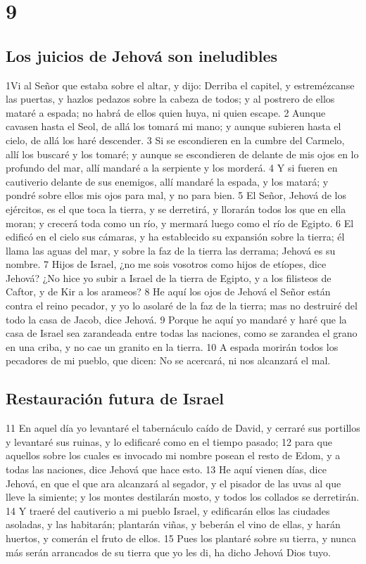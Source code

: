 \chapter{9}

\section*{Los juicios de Jehová son ineludibles}

1Vi al Señor que estaba sobre el altar, y dijo: Derriba el capitel, y estremézcanse las puertas, y hazlos pedazos sobre la cabeza de todos; y al postrero de ellos mataré a espada; no habrá de ellos quien huya, ni quien escape.
2 Aunque cavasen hasta el Seol, de allá los tomará mi mano; y aunque subieren hasta el cielo, de allá los haré descender.
3 Si se escondieren en la cumbre del Carmelo, allí los buscaré y los tomaré; y aunque se escondieren de delante de mis ojos en lo profundo del mar, allí mandaré a la serpiente y los morderá.
4 Y si fueren en cautiverio delante de sus enemigos, allí mandaré la espada, y los matará; y pondré sobre ellos mis ojos para mal, y no para bien.
5 El Señor, Jehová de los ejércitos, es el que toca la tierra, y se derretirá, y llorarán todos los que en ella moran; y crecerá toda como un río, y mermará luego como el río de Egipto.
6 El edificó en el cielo sus cámaras, y ha establecido su expansión sobre la tierra; él llama las aguas del mar, y sobre la faz de la tierra las derrama; Jehová es su nombre.
7 Hijos de Israel, ¿no me sois vosotros como hijos de etíopes, dice Jehová? ¿No hice yo subir a Israel de la tierra de Egipto, y a los filisteos de Caftor, y de Kir a los arameos?
8 He aquí los ojos de Jehová el Señor están contra el reino pecador, y yo lo asolaré de la faz de la tierra; mas no destruiré del todo la casa de Jacob, dice Jehová. 
9 Porque he aquí yo mandaré y haré que la casa de Israel sea zarandeada entre todas las naciones, como se zarandea el grano en una criba, y no cae un granito en la tierra.
10 A espada morirán todos los pecadores de mi pueblo, que dicen: No se acercará, ni nos alcanzará el mal.

\section*{Restauración futura de Israel}

11 En aquel día yo levantaré el tabernáculo caído de David, y cerraré sus portillos y levantaré sus ruinas, y lo edificaré como en el tiempo pasado;
12 para que aquellos sobre los cuales es invocado mi nombre posean el resto de Edom, y a todas las naciones, dice Jehová que hace esto. 
13 He aquí vienen días, dice Jehová, en que el que ara alcanzará al segador, y el pisador de las uvas al que lleve la simiente; y los montes destilarán mosto, y todos los collados se derretirán.
14 Y traeré del cautiverio a mi pueblo Israel, y edificarán ellos las ciudades asoladas, y las habitarán; plantarán viñas, y beberán el vino de ellas, y harán huertos, y comerán el fruto de ellos.
15 Pues los plantaré sobre su tierra, y nunca más serán arrancados de su tierra que yo les di, ha dicho Jehová Dios tuyo.

